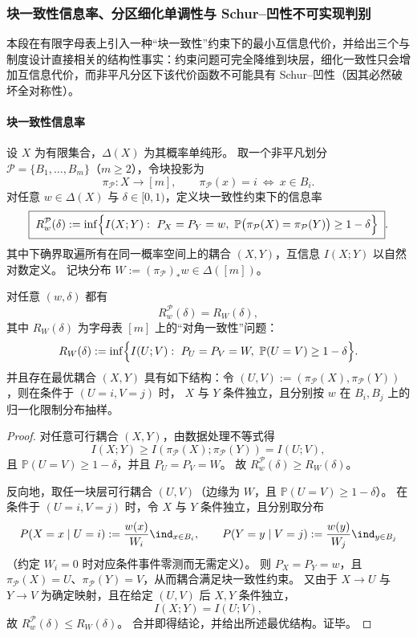 \subsubsection{块一致性信息率、分区细化单调性与 Schur--凹性不可实现判别}\label{subsubsec:pom-block-consistency-information-rate}
本段在有限字母表上引入一种“块一致性”约束下的最小互信息代价，并给出三个与制度设计直接相关的结构性事实：约束问题可完全降维到块层，细化一致性只会增加互信息代价，而非平凡分区下该代价函数不可能具有 Schur--凹性（因其必然破坏全对称性）。

\paragraph{块一致性信息率}
设 \(X\) 为有限集合，\(\Delta(X)\) 为其概率单纯形。
取一个非平凡划分 \(\mathcal P=\{B_1,\dots,B_m\}\)（\(m\ge 2\)），令块投影为
\[
\pi_{\mathcal P}:X\to[m],\qquad \pi_{\mathcal P}(x)=i\ \Longleftrightarrow\ x\in B_i.
\]
对任意 \(w\in\Delta(X)\) 与 \(\delta\in[0,1)\)，定义块一致性约束下的信息率
\begin{equation}\label{eq:pom-block-consistency-information-rate}
\boxed{\;
R^{\mathcal P}_w(\delta)
:=
\inf\Bigl\{I(X;Y):\ P_X=P_Y=w,\ \mathbb{P}\bigl(\pi_{\mathcal P}(X)=\pi_{\mathcal P}(Y)\bigr)\ge 1-\delta\Bigr\}\; }.
\end{equation}
其中下确界取遍所有在同一概率空间上的耦合 \((X,Y)\)，互信息 \(I(X;Y)\) 以自然对数定义。
记块分布 \(W:= (\pi_{\mathcal P})_* w\in\Delta([m])\)。

\begin{theorem}\label{thm:pom-block-consistency-rate-block-reduction}
对任意 \((w,\delta)\) 都有
\[
R^{\mathcal P}_w(\delta)=R_W(\delta),
\]
其中 \(R_W(\delta)\) 为字母表 \([m]\) 上的“对角一致性”问题：
\[
R_W(\delta)
:=
\inf\Bigl\{I(U;V):\ P_U=P_V=W,\ \mathbb{P}(U=V)\ge 1-\delta\Bigr\}.
\]
并且存在最优耦合 \((X,Y)\) 具有如下结构：令 \((U,V):=(\pi_{\mathcal P}(X),\pi_{\mathcal P}(Y))\)，则在条件于 \((U=i,V=j)\) 时，
\(X\) 与 \(Y\) 条件独立，且分别按 \(w\) 在 \(B_i,B_j\) 上的归一化限制分布抽样。
\end{theorem}
\begin{proof}
对任意可行耦合 \((X,Y)\)，由数据处理不等式得
\[
I(X;Y)\ge I(\pi_{\mathcal P}(X);\pi_{\mathcal P}(Y))=I(U;V),
\]
且 \(\mathbb{P}(U=V)\ge 1-\delta\)，并且 \(P_U=P_V=W\)。
故 \(R^{\mathcal P}_w(\delta)\ge R_W(\delta)\)。
\par
反向地，取任一块层可行耦合 \((U,V)\)（边缘为 \(W\)，且 \(\mathbb{P}(U=V)\ge 1-\delta\)）。
在条件于 \((U=i,V=j)\) 时，令 \(X\) 与 \(Y\) 条件独立，且分别取分布
\[
P(X=x\mid U=i):=\frac{w(x)}{W_i}\ind_{x\in B_i},
\qquad
P(Y=y\mid V=j):=\frac{w(y)}{W_j}\ind_{y\in B_j}
\]
（约定 \(W_i=0\) 时对应条件事件零测而无需定义）。
则 \(P_X=P_Y=w\)，且 \(\pi_{\mathcal P}(X)=U\)、\(\pi_{\mathcal P}(Y)=V\)，从而耦合满足块一致性约束。
又由于 \(X\to U\) 与 \(Y\to V\) 为确定映射，且在给定 \((U,V)\) 后 \(X,Y\) 条件独立，
\[
I(X;Y)=I(U;V),
\]
故 \(R^{\mathcal P}_w(\delta)\le R_W(\delta)\)。
合并即得结论，并给出所述最优结构。证毕。
\end{proof}

